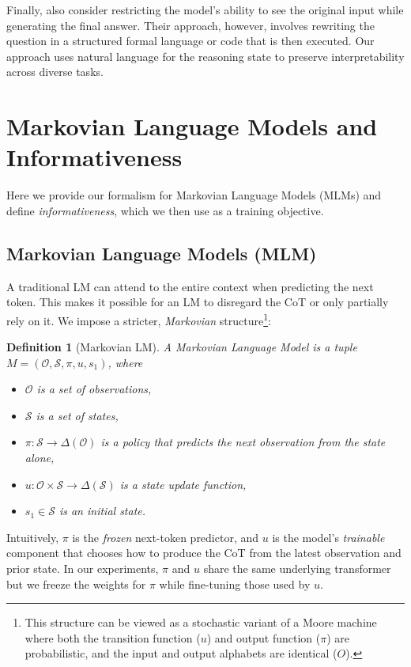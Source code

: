 \documentclass{article}
\newtheorem{definition}{Definition}
\theoremstyle{plain}
\theoremstyle{definition}
\theoremstyle{remark}
\begin{document}
Finally, \citet{lyu2023faithful} also consider restricting the model's ability to see the original input while generating the final answer. Their approach, however, involves rewriting the question in a structured formal language or code that is then executed. Our approach uses natural language for the reasoning state to preserve interpretability across diverse tasks.

\section{Markovian Language Models and Informativeness}
\label{sec:MLM}

Here we provide our formalism for Markovian Language Models (MLMs) and define \emph{informativeness}, which we then use as a training objective.

\subsection{Markovian Language Models (MLM)}

A traditional LM can attend to the entire context when predicting the next token. This makes it possible for an LM to disregard the CoT or only partially rely on it. We impose a stricter, \emph{Markovian} structure\footnote{This structure can be viewed as a stochastic variant of a Moore machine where both the transition function ($u$) and output function ($\pi$) are probabilistic, and the input and output alphabets are identical ($O$).}:
\begin{definition}[Markovian LM]
A Markovian Language Model is a tuple $M=(\mathcal{O}, \mathcal{S}, \pi, u, s_1)$, where
\begin{itemize}
\item $\mathcal{O}$ is a set of observations,
\item $\mathcal{S}$ is a set of states,
\item $\pi: \mathcal{S}\rightarrow \Delta(\mathcal{O})$ is a policy that predicts the next observation from the state alone,
\item $u: \mathcal{O}\times\mathcal{S}\rightarrow \Delta(\mathcal{S})$ is a state update function,
\item $s_1\in \mathcal{S}$ is an initial state.
\end{itemize}
\end{definition}
Intuitively, $\pi$ is the \emph{frozen} next-token predictor, and $u$ is the model's \emph{trainable} component that chooses how to produce the CoT from the latest observation and prior state. In our experiments, $\pi$ and $u$ share the same underlying transformer but we freeze the weights for $\pi$ while fine-tuning those used by $u$. 
\end{document}
